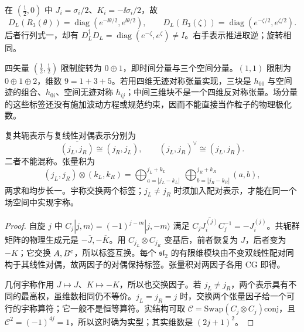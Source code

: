 \begin{workedexample}
在 $(\tfrac12,0)$ 中 $J_i=\sigma_i/2$、$K_i=-\ii\sigma_i/2$，故
\[
 D_L(R_3(\theta))=\operatorname{diag}(e^{-\ii\theta/2},e^{\ii\theta/2}),\qquad
 D_L(B_3(\zeta))=\operatorname{diag}(e^{-\zeta/2},e^{\zeta/2}).
\]
后者行列式一，却有 $D_L^\dagger D_L=\operatorname{diag}(e^{-\zeta},e^\zeta)\ne I$。右手表示推进取逆；旋转相同。

四矢量 $(\tfrac12,\tfrac12)$ 限制旋转为 $0\oplus1$，即时间分量与三个空间分量。$(1,1)$ 限制为 $0\oplus1\oplus2$，维数 $9=1+3+5$。若用四维无迹对称张量实现，三块是 $h_{00}$ 与空间迹的组合、$h_{0i}$、空间无迹对称 $h_{ij}$；中间三维块不是一个四维反对称张量。场分量的这些标签还没有施加波动方程或规范约束，因而不能直接当作粒子的物理极化数。
\end{workedexample}

\begin{proposition}[共轭、对偶、张量积与宇称]
复共轭表示与复线性对偶表示分别为
\begin{equation}
 \overline{(j_L,j_R)}\cong(j_R,j_L),\qquad (j_L,j_R)^\vee\cong(j_L,j_R).
 \label{eq:lorentz-conjugate}
\end{equation}
二者不能混称。张量积为
\begin{equation}
 (j_L,j_R)\otimes(k_L,k_R)
 =\bigoplus_{a=|j_L-k_L|}^{j_L+k_L}\ \bigoplus_{b=|j_R-k_R|}^{j_R+k_R}(a,b),
 \label{eq:lorentz-tensor-product}
\end{equation}
两求和均步长一。宇称交换两个标签；$j_L\ne j_R$ 时须加入配对表示，才能在同一个场空间中实现宇称。
\end{proposition}
\begin{proof}
自旋 $j$ 中 $C_j|j,m\rangle=(-1)^{j-m}|j,-m\rangle$ 满足 $C_j\overline{J_i^{(j)}}C_j^{-1}=-J_i^{(j)}$。共轭群矩阵的物理生成元是 $-\overline J,-\overline K$。用 $C_{j_L}\otimes C_{j_R}$ 变基后，前者恢复为 $J$，后者变为 $-K$；它交换 $A,B^{\rm c}$，所以标签互换。每个 $\mathfrak{sl}_2$ 的有限维模块由不变双线性配对同构于其线性对偶，故两因子的对偶保持标签。张量积对两因子各用 CG 即得。

几何宇称作用 $J\mapsto J$、$K\mapsto-K$，所以也交换因子。若 $j_L\ne j_R$，两个表示具有不同的最高权，虽维数相同仍不等价。$j_L=j_R=j$ 时，交换两个张量因子给一个可行的宇称算符；它一般不是恒等算符。实结构可取 $\mathcal C=\mathrm{Swap}(C_j\otimes C_j)\mathrm{conj}$，且 $\mathcal C^2=(-1)^{4j}=1$，所以这时确为实型；其实维数是 $(2j+1)^2$。
\end{proof}

